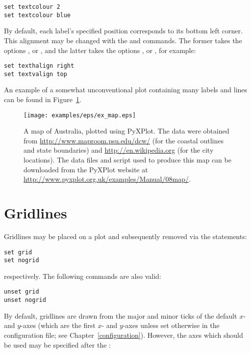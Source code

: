 \begin{verbatim}
set textcolour 2
set textcolour blue
\end{verbatim}

By default, each label's specified
position corresponds to its bottom left corner. This alignment may be changed
with the  and  commands. The
former takes the options ,  or ,
and the latter takes the options ,  or
, for example:

\begin{verbatim}
set texthalign right
set textvalign top
\end{verbatim}

An example of a somewhat unconventional plot containing many labels and lines can be found in Figure~\ref{fig:ex_map}.

\begin{figure}
\begin{center}
\texttt{[image: examples/eps/ex\_map.eps]}
\end{center}
\caption[A map of Australia, plotted using PyXPlot]
{A map of Australia, plotted using PyXPlot.  The data were obtained
from \protect\url{http://www.maproom.psu.edu/dcw/} (for the coastal outlines
and state boundaries) and \protect\url{http://en.wikipedia.org} (for the city
locations).  The data files and script used to produce this map can be
downloaded from the PyXPlot website at
\protect\url{http://www.pyxplot.org.uk/examples/Manual/08map/}.}
\label{fig:ex_map}
\end{figure}

\section{Gridlines}

Gridlines may be placed on a plot and subsequently removed via the statements:

\begin{verbatim}
set grid
set nogrid
\end{verbatim}

\noindent respectively. The following commands are also valid:

\begin{verbatim}
unset grid
unset nogrid
\end{verbatim}

\noindent By default, gridlines are drawn from the major and minor ticks of the
default $x$- and $y$-axes (which are the first $x$- and $y$-axes unless set
otherwise in the configuration file; see Chapter~\ref{configuration}). However,
the axes which should be used may be specified after the :

